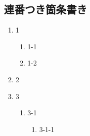 \subsection{連番つき箇条書き}\hypertarget{連番つき箇条書き}{}\label{連番つき箇条書き}

\begin{enumerate}
\item{} 1


\begin{enumerate}
\item{} 1-1
\item{} 1-2
\end{enumerate}
\item{} 2
\item{} 3


\begin{enumerate}
\item{} 3-1


\begin{enumerate}
\item{} 3-1-1
\end{enumerate}
\end{enumerate}
\end{enumerate}

